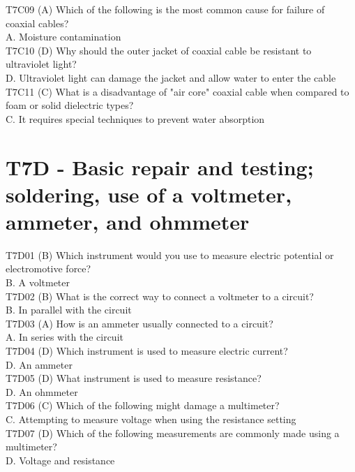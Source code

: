\documentclass[12pt,letterpaper]{report}
\begin{document}
T7C09 (A) Which of the following is the most common cause for failure of coaxial cables?\\
A. Moisture contamination\\

T7C10 (D) Why should the outer jacket of coaxial cable be resistant to ultraviolet light?\\
D. Ultraviolet light can damage the jacket and allow water to enter the cable\\

T7C11 (C) What is a disadvantage of "air core" coaxial cable when compared to foam or solid dielectric types?\\
C. It requires special techniques to prevent water absorption\\

\section{T7D - Basic repair and testing; soldering, use of a voltmeter, ammeter, and ohmmeter}

T7D01 (B) Which instrument would you use to measure electric potential or electromotive force?\\
B. A voltmeter\\

T7D02 (B) What is the correct way to connect a voltmeter to a circuit?\\
B. In parallel with the circuit\\

T7D03 (A) How is an ammeter usually connected to a circuit?\\
A. In series with the circuit\\

T7D04 (D) Which instrument is used to measure electric current?\\
D. An ammeter\\

T7D05 (D) What instrument is used to measure resistance?\\
D. An ohmmeter\\

T7D06 (C) Which of the following might damage a multimeter?\\
C. Attempting to measure voltage when using the resistance setting\\

T7D07 (D)
Which of the following measurements are commonly made using a multimeter?\\
D. Voltage and resistance\\
\end{document}
